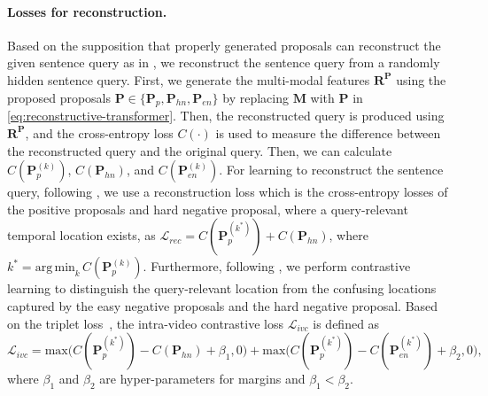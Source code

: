 \paragraph{Losses for reconstruction.}
Based on the supposition that properly generated proposals can reconstruct the given sentence query as in \cite{lin2020weakly, song2020weakly}, we reconstruct the sentence query from a randomly hidden sentence query.
First, we generate the multi-modal features $\mathbf{R}^\mathbf{P}$ using the proposed proposals $\mathbf{P}\in\{\mathbf{P}_{p}, \mathbf{P}_{hn}, \mathbf{P}_{en}\}$ by replacing $\mathbf{M}$ with $\mathbf{P}$ in \cref{eq:reconstructive-transformer}.
Then, the reconstructed query is produced using $\mathbf{R}^\mathbf{P}$, and the cross-entropy loss $C(\cdot)$ is used to measure the difference between the reconstructed query and the original query.
Then, we can calculate $C(\mathbf{P}_{p}^{(k)})$, $C(\mathbf{P}_{hn})$, and
$C(\mathbf{P}_{en}^{(k)})$.
For learning to reconstruct the sentence query, following \cite{lin2020weakly}, we use a reconstruction loss which is the cross-entropy losses of the positive proposals and hard negative proposal, where a query-relevant temporal location exists, as
\begin{math}
\mathcal{L}_{rec}=C(\mathbf{P}_{p}^{(k^*)})+C\left(\mathbf{P}_{hn}\right) \text{,}
\end{math}
where
\begin{math}
  k^* = \mathrm{arg\,min}_k\,C(\mathbf{P}_{p}^{(k)}) \text{.}
\end{math}
Furthermore, following \cite{zheng2022cnm}, we perform contrastive learning to distinguish the query-relevant location from the confusing locations captured by the easy negative proposals and the hard negative proposal.
Based on the triplet loss~\cite{wang2014learning}, the intra-video contrastive loss $\mathcal{L}_{ivc}$ is defined as
\begin{math}
  \mathcal{L}_{ivc}=
  \mathrm{max}\bigl(C(\mathbf{P}_{p}^{(k^*)})-C(\mathbf{P}_{hn})+\beta_1,0\bigr)+
  \mathrm{max}\bigl(C(\mathbf{P}_{p}^{(k^*)})-C(\mathbf{P}_{en}^{(k^*)})+\beta_2,0\bigr)
  \text{,}
\end{math}
where $\beta_1$ and $\beta_2$ are hyper-parameters for margins and $\beta_1 < \beta_2$.


